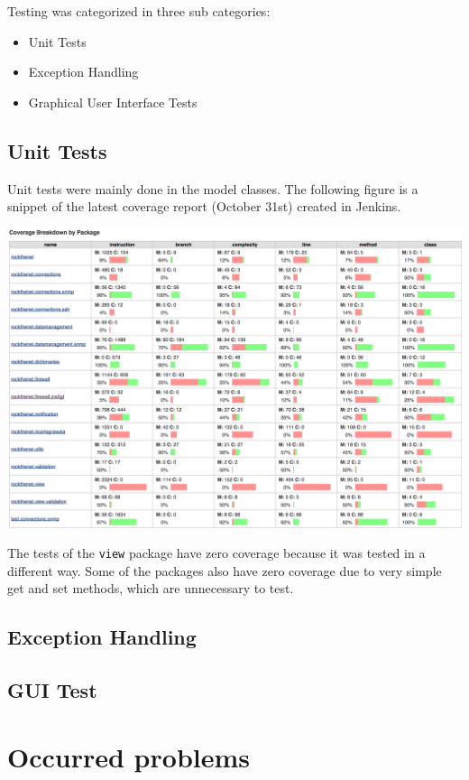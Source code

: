\documentclass[11pt, a4paper]{article}
\begin{document}
Testing was categorized in three sub categories:

\begin{itemize}
	\item Unit Tests
	\item Exception Handling
	\item Graphical User Interface Tests
\end{itemize}

\subsection{Unit Tests}

Unit tests were mainly done in the model classes. The following figure is a snippet of the latest coverage report (October 31st) created in Jenkins. 

\includegraphics[width=\textwidth]{images/coverage}

The tests of the \lstinline|view| package have zero coverage because it was tested in a different way. Some of the packages also have zero coverage due to very simple get and set methods, which are unnecessary to test.  

\subsection{Exception Handling}
\subsection{GUI Test}

\section{Occurred problems}
\end{document}
